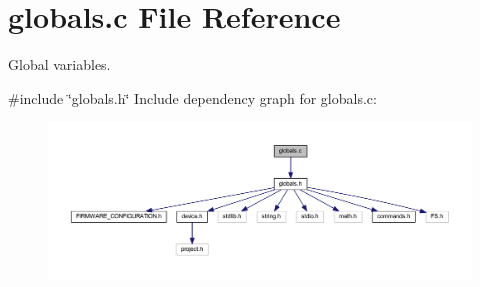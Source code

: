 \section{globals.\+c File Reference}
\label{globals_8c}


Global variables.  


{\ttfamily \#include \char`\"{}globals.\+h\char`\"{}}\newline
Include dependency graph for globals.\+c\+:\nopagebreak
\begin{figure}[H]
\begin{center}
\leavevmode
\includegraphics[width=350pt]{globals_8c__incl}
\end{center}
\end{figure}

